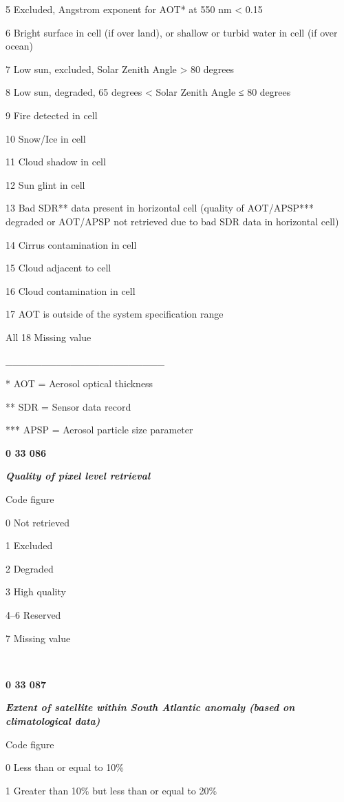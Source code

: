 5 Excluded, Angstrom exponent for AOT* at 550 nm \textless{} 0.15

6 Bright surface in cell (if over land), or shallow or turbid water in cell (if over ocean)

7 Low sun, excluded, Solar Zenith Angle \textgreater{} 80 degrees

8 Low sun, degraded, 65 degrees \textless{} Solar Zenith Angle ≤ 80 degrees

9 Fire detected in cell

10 Snow/Ice in cell

11 Cloud shadow in cell

12 Sun glint in cell

13 Bad SDR** data present in horizontal cell (quality of AOT/APSP*** degraded or AOT/APSP not retrieved due to bad SDR data in horizontal cell)

14 Cirrus contamination in cell

15 Cloud adjacent to cell

16 Cloud contamination in cell

17 AOT is outside of the system specification range

All 18 Missing value

\_\_\_\_\_\_\_\_\_\_\_\_\_\_\_\_\_\_\_\_\_\_

* AOT = Aerosol optical thickness

** SDR = Sensor data record

*** APSP = Aerosol particle size parameter

\textbf{0 33 086}

\emph{\textbf{Quality of pixel level retrieval}}

Code figure

0 Not retrieved

1 Excluded

2 Degraded

3 High quality

4--6 Reserved

7 Missing value

\textbf{\\
}

\textbf{0 33 087}

\emph{\textbf{Extent of satellite within South Atlantic anomaly (based on climatological data)}}

Code figure

0 Less than or equal to 10\%

1 Greater than 10\% but less than or equal to 20\%

